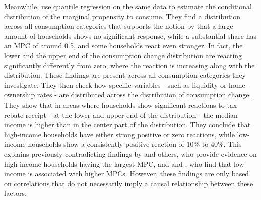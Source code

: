 Meanwhile, \cite{misrasurico_2014} use quantile regression on the same data to estimate the conditional distribution of the marginal propensity to consume. They find a distribution across all consumption categories that supports the notion by \cite{kaplanviolante_2014} that a large amount of households shows no significant response, while a substantial share has an MPC of around 0.5, and some households react even stronger. In fact, the lower and the upper end of the consumption change distribution are reacting significantly differently from zero, where the reaction is increasing along with the distribution. These findings are present across all consumption categories they investigate. They then check how specific variables - such as liquidity or home-ownership rates - are distributed across the distribution of consumption change. They show that in areas where households show significant reactions to tax rebate receipt - at the lower and upper end of the distribution - the median income is higher than in the center part of the distribution. They conclude that high-income households have either strong positive or zero reactions, while low-income households show a consistently positive reaction of 10\% to 40\%. This explains previously contradicting findings by \cite{sahmetal_2010} and others, who provide evidence on high-income households having the largest MPC, and \cite{jps_2006} and \cite{parkeretal_2013}, who find that low income is associated with higher MPCs. However, these findings are only based on correlations that do not necessarily imply a causal relationship between these factors. \\ 

